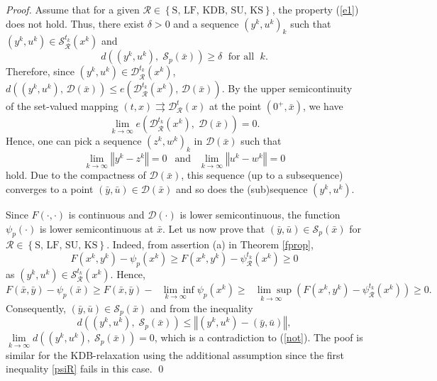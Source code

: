 \begin{proof}
Assume that for a given $\mathcal{R}\in  \left\{\text{S}, \, \text{LF}, \,\text{KDB}, \, \text{SU},\, \text{KS}\right\}$, the property (\ref{e1}) does not hold. Thus,  there exist $\delta >0$ and a sequence $(y^{k},u^{k})_{k}$ such that $(y^{k},u^{k})\in\mathcal{S}_\mathcal{R}^{t_{k}}(x^{k})$ and
\begin{equation}\label{not}
d\left((y^{k},u^{k}),\;\mathcal{S}_p(\bar{x})\right) \geq \delta \;\mbox{ for all }\; k.
\end{equation}
Therefore, since $(y^{k},u^{k})\in \mathcal{D}_\mathcal{R}^{t_{k}}(x^{k})$, 
$
d\left((y^{k},u^{k}), \,\mathcal{D}(\bar{x})\right)\leq e\left(\mathcal{D}_\mathcal{R}^{t_{k}}(x^{k}
), \,\mathcal{D}(\bar{x})\right).
$
By the upper semicontinuity of the set-valued mapping $(t,x) \rightrightarrows \mathcal{D}_\mathcal{R}^{t}(x)$ at the point $\left(0^+,\bar{x}\right)$,  we have  
\[
\underset{k \rightarrow
		\infty}{\lim }e\left(\mathcal{D}^{t_{k}}_\mathcal{R}(x^{k}), \;\mathcal{D}(\bar{x})\right)=0.
\]
Hence, one can pick a sequence  $(z^{k},w^{k})_k$ in $\mathcal{D}(\bar{x})$ such that
\[
    \underset{k \rightarrow
		\infty}{\lim }\left\Vert y^{k}-z^{k}\right\Vert = 0 \;\, \text{ and } \;\,\underset{k \rightarrow
		\infty}{\lim }\left\Vert
	u^{k}-w^{k}\right\Vert = 0
\]
hold. Due to the compactness of $\mathcal{D}(\bar{x})$, this sequence (up to a subsequence) converges to a point $(\bar{y},\bar
{u})\in\mathcal{D}(\bar{x})$ and so does the (sub)sequence $(y^{k},u^{k})$.

Since $F(\cdot,\cdot)$ is continuous and $\mathcal{D}(\cdot)$ is lower
semicontinuous, the function $\psi_{p}(\cdot)$ is lower semicontinuous at
$\bar{x}$. Let us now prove that $(\bar{y},\bar{u})\in\mathcal{S}_{p}(\bar{x})$ for $\mathcal{R}\in  \left\{\mbox{S}, \, \mbox{LF}, \, \mbox{SU},\, \mbox{KS}\right\}$. Indeed,
from assertion (a) in Theorem \ref{fprop}, 
\begin{equation} \label{psiR}
    F(x^{k},y^{k})-\psi_{p}(x^{k})\geq F(x^{k},y^{k})-\psi_\mathcal{R}^{t_{k}}
(x^{k})\geq0
\end{equation}
as $(y^{k},u^{k})\in\mathcal{S}_\mathcal{R}^{t_{k}}(x^{k})$.  Hence,
\[
F(\bar{x},\bar{y})-\psi_{p}(\bar{x})\geq F(\bar{x},\bar{y})-\underset
{k\rightarrow\infty}{\text{ }\lim\inf}\psi_{p}(x^{k})\geq \underset
{k\rightarrow\infty}{\text{ }\lim\sup}(F(x^{k},y^{k})-\psi_\mathcal{R}^{t_{k}}(x^{k}
))\geq0.
\]
Consequently, $(\bar{y},\bar{u})\in\mathcal{S}_{p}(\bar{x})$ and from the inequality
\[
d\left((y^{k},u^{k}), \;\mathcal{S}_{p}(\bar{x})\right)\leq\left\Vert (y^{k},u^{k})-(\bar
{y},\bar{u})\right\Vert,
\]
$\underset{k\longrightarrow\infty}{\lim}d\left(\left(y^{k},u^{k}\right), \;\mathcal{S}_{p}
(\bar{x})\right)=0$, which is a contradiction to (\ref{not}).  The  poof  is similar for the KDB-relaxation using the additional assumption since the first inequality  \eqref{psiR} fails in this case. \hfill \qed
\end{proof}

